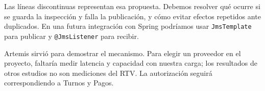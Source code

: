 Las líneas discontinuas representan esa propuesta. Debemos resolver qué ocurre si se guarda la inspección y falla la publicación, y cómo evitar efectos repetidos ante duplicados. En una futura integración con Spring podríamos usar \texttt{JmsTemplate} para publicar y \texttt{@JmsListener} para recibir.\cite{springjms}

Artemis sirvió para demostrar el mecanismo. Para elegir un proveedor en el proyecto, faltaría medir latencia y capacidad con nuestra carga; los resultados de otros estudios no son mediciones del RTV.\cite{maharjan2023} La autorización seguirá correspondiendo a Turnos y Pagos.
